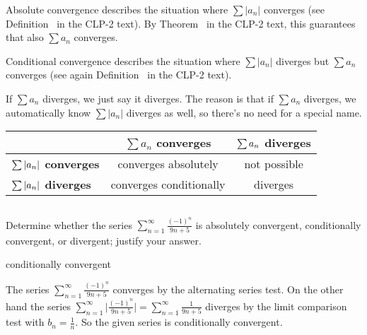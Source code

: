 \begin{solution}
Absolute convergence describes the situation where $\sum |a_n|$ converges (see Definition~ in the CLP-2 text). By Theorem~ in the CLP-2 text, this guarantees that also $\sum a_n$ converges.

Conditional convergence describes the situation where $\sum |a_n|$ diverges but $\sum a_n$ converges (see again Definition~ in the CLP-2 text).

If $\sum a_n$ diverges, we just say it diverges. The reason is that if $\sum a_n$ diverges, we automatically know $\sum |a_n|$ diverges as well, so there's no need for a special name.
\begin{center}
\begin{tabular}{|l|c|c|}
\hline
& \textbf{$\sum a_n$ converges} & \textbf{$\sum\vphantom{^{\frac12}} a_n$ diverges}\\[10pt]
\hline
 \textbf{$\sum\vphantom{^{\frac12}}  |a_n|$ converges}&converges absolutely&not possible\\[10pt]
 \hline
  \textbf{$\sum\vphantom{^{\frac12}}  |a_n|$ diverges}&converges conditionally&diverges\\[10pt]
  \hline
\end{tabular}
\end{center}

\end{solution}




\subsection*{\Procedural}

\begin{Mquestion}[2015A]
Determine whether the series $\displaystyle\sum_{n=1}^{\infty}\displaystyle\frac{(-1)^n}{9n+5}$ is absolutely convergent, conditionally convergent, or divergent; justify your answer.
\end{Mquestion}


\begin{answer}
conditionally convergent
\end{answer}

\begin{solution}
The series $\sum\limits_{n=1}^{\infty}\frac{(-1)^n}{9n+5}$
converges by the alternating series test. On the other hand the
series $\sum\limits_{n=1}^{\infty}\big|\frac{(-1)^n}{9n+5}\big|
=\sum_{n=1}^{\infty}\frac{1}{9n+5}$ diverges by the limit
comparison test with $b_n=\frac{1}{n}$. So the given series is
conditionally convergent.
\end{solution}

